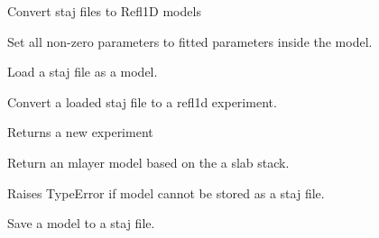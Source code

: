 \documentclass[letterpaper,10pt,english]{sphinxmanual}
\begin{document}
\label{api/stajconvert:module-refl1d.stajconvert}
Convert staj files to Refl1D models

\begin{fulllineitems}
\label{api/stajconvert:refl1d.stajconvert.fit_all}
Set all non-zero parameters to fitted parameters inside the model.

\end{fulllineitems}


\begin{fulllineitems}
\label{api/stajconvert:refl1d.stajconvert.load_mlayer}
Load a staj file as a model.

\end{fulllineitems}


\begin{fulllineitems}
\label{api/stajconvert:refl1d.stajconvert.mlayer_to_model}
Convert a loaded staj file to a refl1d experiment.

Returns a new experiment

\end{fulllineitems}


\begin{fulllineitems}
\label{api/stajconvert:refl1d.stajconvert.model_to_mlayer}
Return an mlayer model based on the a slab stack.

Raises TypeError if model cannot be stored as a staj file.

\end{fulllineitems}


\begin{fulllineitems}
\label{api/stajconvert:refl1d.stajconvert.save_mlayer}
Save a model to a staj file.

\end{fulllineitems}
\end{document}
